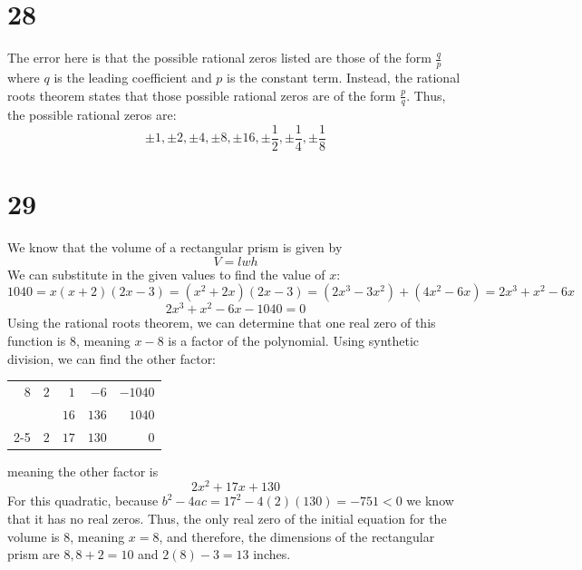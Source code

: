 \documentclass{article}
\theoremstyle{definition}
\begin{document}
\section*{28}
The error here is that the possible rational zeros listed are those of the form $\frac{q}{p}$ where $q$ is the leading coefficient and $p$ is 
the constant term. Instead, the rational roots theorem states that those possible rational zeros are of the form $\frac{p}{q}$. Thus, the possible 
rational zeros are:
\[ \pm 1, \pm 2, \pm 4, \pm 8, \pm 16, \pm\frac{1}{2}, \pm\frac{1}{4},\pm\frac{1}{8} \]

\section*{29}
We know that the volume of a rectangular prism is given by \[ V=lwh \] We can substitute in the given values to find the value of $x$:
\[ 1040=x(x+2)(2x-3)=(x^2+2x)(2x-3)=(2x^3-3x^2)+(4x^2-6x)=2x^3+x^2-6x \]
\[ 2x^3+x^2-6x-1040=0 \]
Using the rational roots theorem, we can determine that one real zero of this function is $8$, meaning $x-8$ is a factor of the polynomial. Using 
synthetic division, we can find the other factor:
\begin{center}
\begin{tabular}{r|rrrr}
	$8$ & $2$ & $1$ & $-6$ & $-1040$ \\
	& & $16$ & $136$ & $1040$ \\
	\cmidrule{2-5}
	& $2$ & $17$ & $130$ & $0$
\end{tabular}
\end{center}
meaning the other factor is \[ 2x^2+17x+130 \] For this quadratic, because $b^2-4ac=17^2-4(2)(130)=-751<0$ we know that it has no real zeros. Thus, 
the only real zero of the initial equation for the volume is $8$, meaning $x=8$, and therefore, the dimensions of the rectangular prism are 
$8,8+2=10$ and $2(8)-3=13$ inches.
\end{document}
